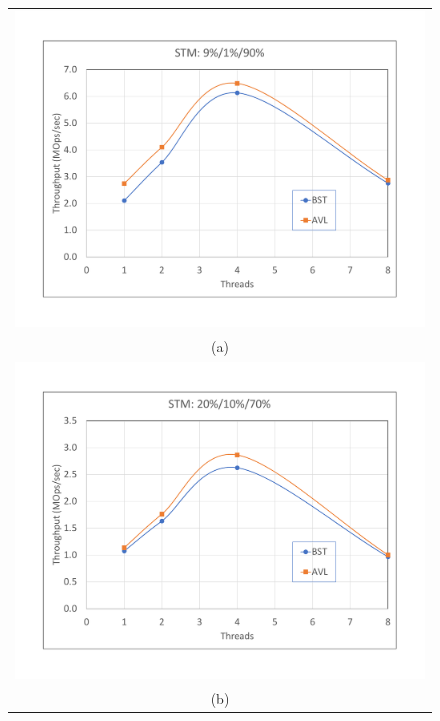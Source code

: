\documentclass[conference]{IEEEtran}
\begin{document}
\begin{figure}[H]
\begin{tabular}{c}
\includegraphics[width =\linewidth]{figures/stm1-9-1-90}\\
(a) \\
\includegraphics[width =\linewidth]{figures/stm1-20-10-70}\\
(b) \\

\end{tabular}
\end{figure}
\end{document}
